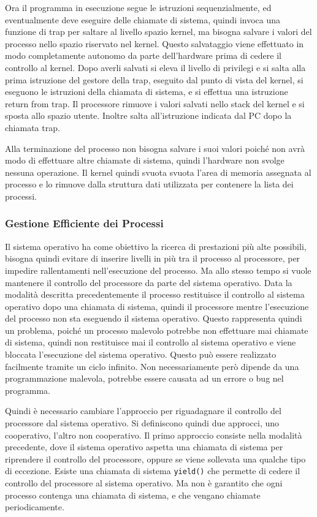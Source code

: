 \documentclass{article}
\numberwithin{equation}{subsection}
\begin{document}
Ora il programma in esecuzione segue le istruzioni sequenzialmente, ed eventualmente deve eseguire delle chiamate di sistema, quindi invoca una funzione di trap per 
saltare al livello spazio kernel, ma bisogna salvare i valori del processo nello spazio riservato nel kernel. Questo salvataggio viene effettuato in modo completamente autonomo 
da parte dell'hardware prima di cedere il controllo al kernel. Dopo averli salvati si eleva il livello di privilegi e si salta alla prima istruzione del gestore della trap, 
eseguito dal punto di vista del kernel, si eseguono le istruzioni della chiamata di sistema, e si effettua una istruzione return from trap. 
Il processore rimuove i valori salvati nello stack del kernel e si sposta allo spazio utente. Inoltre salta all'istruzione indicata dal PC dopo la chiamata trap. 

Alla terminazione del processo non bisogna salvare i suoi valori poiché non avrà modo di effettuare altre chiamate di sistema, quindi l'hardware non svolge nessuna 
operazione. Il kernel quindi svuota svuota l'area di memoria assegnata al processo e lo rimuove dalla struttura dati utilizzata per contenere la lista dei processi. 

\subsubsection{Gestione Efficiente dei Processi}

Il sistema operativo ha come obiettivo la ricerca di prestazioni più alte possibili, bisogna quindi evitare di inserire livelli in più tra il processo al processore, per 
impedire rallentamenti nell'esecuzione del processo. Ma allo stesso tempo si vuole mantenere il controllo del processore da parte del sistema operativo. 
Data la modalità descritta precedentemente il processo restituisce il controllo al sistema operativo dopo una chiamata di sistema, quindi il processore mentre l'esecuzione del 
processo non sta eseguendo il sistema operativo. Questo rappresenta quindi un problema, poiché un processo malevolo potrebbe non effettuare mai chiamate di sistema, quindi 
non restituisce mai il controllo al sistema operativo e viene bloccata l'esecuzione del sistema operativo. Questo può essere realizzato facilmente tramite un ciclo 
infinito. Non necessariamente però dipende da una programmazione malevola, potrebbe essere causata ad un errore o bug nel programma. 

Quindi è necessario cambiare l'approccio per riguadagnare il controllo del processore dal sistema operativo. Si definiscono quindi due approcci, uno cooperativo, l'altro 
non cooperativo. Il primo approccio consiste nella modalità precedente, dove il sistema operativo aspetta una chiamata di sistema per riprendere il controllo del processore, 
oppure se viene sollevata una qualche tipo di eccezione. 
Esiste una chiamata di sistema \verb|yield()| che permette di cedere il controllo del processore al sistema operativo. Ma non è garantito che ogni processo contenga 
una chiamata di sistema, e che vengano chiamate periodicamente. 
\end{document}
